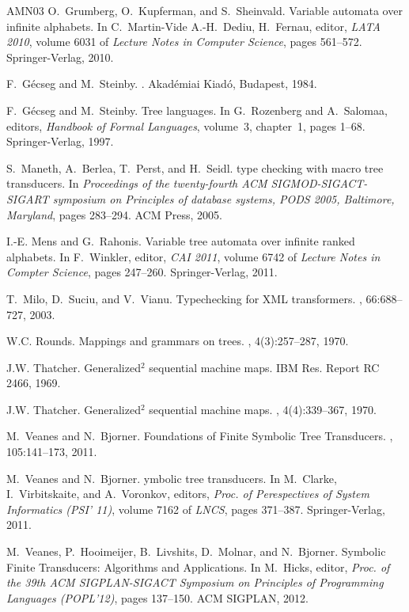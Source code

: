 \documentclass[10pt]{scrartcl}
\begin{document}
\begin{thebibliography}{AMN{\etalchar{+}}03}
O.~Grumberg, O.~Kupferman, and S.~Sheinvald.
\newblock Variable automata over infinite alphabets.
\newblock In C.~Martin-Vide A.-H.~Dediu, H.~Fernau, editor, {\em LATA 2010},
  volume 6031 of {\em Lecture Notes in Computer Science}, pages 561--572.
  Springer-Verlag, 2010.

F.~G{\'e}cseg and M.~Steinby.
.
\newblock Akad{\'e}miai Kiad{\'o}, Budapest, 1984.

F.~G\'ecseg and M.~Steinby.
\newblock Tree languages.
\newblock In G.~Rozenberg and A.~Salomaa, editors, {\em Handbook of Formal
  Languages}, volume~3, chapter~1, pages 1--68. Springer-Verlag, 1997.

S.~Maneth, A.~Berlea, T.~Perst, and H.~Seidl.
 type checking with macro tree transducers.
\newblock In {\em Proceedings of the twenty-fourth ACM SIGMOD-SIGACT-SIGART
  symposium on Principles of database systems, PODS 2005, Baltimore, Maryland},
  pages 283--294. ACM Press, 2005.

I.-E. Mens and G.~Rahonis.
\newblock Variable tree automata over infinite ranked alphabets.
\newblock In F.~Winkler, editor, {\em CAI 2011}, volume 6742 of {\em Lecture
  Notes in Compter Science}, pages 247--260. Springer-Verlag, 2011.

T.~Milo, D.~Suciu, and V.~Vianu.
\newblock Typechecking for {XML} transformers.
, 66:688--727, 2003.

W.C. Rounds.
\newblock Mappings and grammars on trees.
, 4(3):257--287, 1970.

J.W. Thatcher.
\newblock Generalized$^2$ sequential machine maps.
\newblock IBM Res. Report RC 2466, 1969.

J.W. Thatcher.
\newblock Generalized$^2$ sequential machine maps.
, 4(4):339--367, 1970.

M.~Veanes and N.~Bjorner.
\newblock Foundations of {F}inite {S}ymbolic {T}ree {T}ransducers.
, 105:141--173, 2011.

M.~Veanes and N.~Bjorner.
ymbolic tree transducers.
\newblock In M.~Clarke, I.~Virbitskaite, and A.~Voronkov, editors, {\em Proc.
  of Perespectives of System Informatics (PSI' 11)}, volume 7162 of {\em LNCS},
  pages 371--387. Springer-Verlag, 2011.

M.~Veanes, P.~Hooimeijer, B.~Livshits, D.~Molnar, and N.~Bjorner.
\newblock Symbolic {F}inite {T}ransducers: {A}lgorithms and {A}pplications.
\newblock In M.~Hicks, editor, {\em Proc. of the 39th ACM SIGPLAN-SIGACT
  Symposium on Principles of Programming Languages (POPL'12)}, pages 137--150.
  ACM SIGPLAN, 2012.

\end{thebibliography}
 
\end{document}
